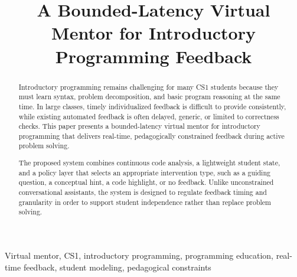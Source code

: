 \documentclass[conference]{IEEEtran}
\begin{document}
\title{A Bounded-Latency Virtual Mentor for Introductory Programming Feedback}

\author{
    \and
}

\maketitle

\begin{abstract}
Introductory programming remains challenging for many CS1 students because they must learn syntax, problem decomposition, and basic program reasoning at the same time. In large classes, timely individualized feedback is difficult to provide consistently, while existing automated feedback is often delayed, generic, or limited to correctness checks. This paper presents a bounded-latency virtual mentor for introductory programming that delivers real-time, pedagogically constrained feedback during active problem solving.

The proposed system combines continuous code analysis, a lightweight student state, and a policy layer that selects an appropriate intervention type, such as a guiding question, a conceptual hint, a code highlight, or no feedback. Unlike unconstrained conversational assistants, the system is designed to regulate feedback timing and granularity in order to support student independence rather than replace problem solving.
\end{abstract}

\begin{IEEEkeywords}
Virtual mentor, CS1, introductory programming, programming education, real-time feedback, student modeling, pedagogical constraints
\end{IEEEkeywords}
\end{document}
